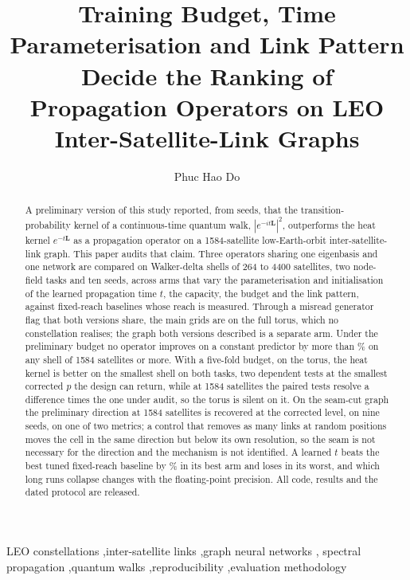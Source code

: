 \documentclass[preprint,11pt,3p]{elsarticle}
\newcommand{\Lap}{\mathbf{L}}
\begin{document}
\begin{frontmatter}

\title{Training Budget, Time Parameterisation and Link Pattern Decide the Ranking of\\
Propagation Operators on LEO Inter-Satellite-Link Graphs}

\author[caira]{Phuc Hao Do}

\begin{abstract}
A preliminary version of this study reported, from \numPrelimSeeds{} seeds, that the
transition-probability kernel of a continuous-time quantum walk, $|e^{-it\Lap}|^{2}$, outperforms
the heat kernel $e^{-t\Lap}$ as a propagation operator on a 1584-satellite low-Earth-orbit
inter-satellite-link graph. This paper audits that claim. Three operators sharing one eigenbasis and one network are compared on Walker-delta
shells of 264 to 4400 satellites, two node-field tasks and ten seeds, across arms that vary the
parameterisation and initialisation of the learned propagation time $t$, the capacity, the
budget and the link pattern, against fixed-reach baselines whose reach is measured. Through a misread generator flag that both
versions share, the main grids are on the full torus, which no constellation realises; the graph both
versions described is a separate arm. Under the preliminary budget no operator
improves on a constant predictor by more than \numGainLargeMax\% on any shell of 1584 satellites
or more. With a five-fold budget, on the torus, the heat kernel is better on the smallest shell on
both tasks, two dependent tests at the smallest corrected $p$ the design can return, while at
1584 satellites the paired tests resolve a difference \numMdeRatioHopsShellOne{} times the one
under audit, so the torus is silent on it. On the seam-cut graph the preliminary direction at
1584 satellites is recovered at the corrected level, on nine seeds, on one of two metrics; a
control that removes as many links at random positions moves the cell in the same direction but
below its own resolution, so the seam is not necessary for the direction and the mechanism is
not identified. A
learned $t$ beats the best tuned fixed-reach baseline by \numLadderGapBestPctHopsShellOne\% in its
best arm and loses in its worst, and which long runs collapse changes with the floating-point
precision. All code, results and the dated protocol are released.
\end{abstract}

\begin{keyword}
LEO constellations \sep inter-satellite links \sep graph neural networks \sep
spectral propagation \sep quantum walks \sep reproducibility \sep evaluation methodology
\end{keyword}

\end{frontmatter}
\end{document}
